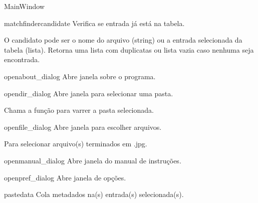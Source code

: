 \documentclass[letterpaper,10pt,portuguese]{manual}
\begin{document}
\begin{classdesc}{MainWindow}{}
\hypertarget{veliger.MainWindow.matchfinder}{}\begin{methoddesc}{matchfinder}{candidate}
Verifica se entrada já está na tabela.

O candidato pode ser o nome do arquivo (string) ou a entrada
selecionada da tabela (lista). Retorna uma lista com duplicatas ou
lista vazia caso nenhuma seja encontrada.
\end{methoddesc}

\hypertarget{veliger.MainWindow.openabout\_dialog}{}\begin{methoddesc}{openabout\_dialog}{}
Abre janela sobre o programa.
\end{methoddesc}

\hypertarget{veliger.MainWindow.opendir\_dialog}{}\begin{methoddesc}{opendir\_dialog}{}
Abre janela para selecionar uma pasta.

Chama a função para varrer a pasta selecionada.
\end{methoddesc}

\hypertarget{veliger.MainWindow.openfile\_dialog}{}\begin{methoddesc}{openfile\_dialog}{}
Abre janela para escolher arquivos.

Para selecionar arquivo(s) terminados em .jpg.
\end{methoddesc}

\hypertarget{veliger.MainWindow.openmanual\_dialog}{}\begin{methoddesc}{openmanual\_dialog}{}
Abre janela do manual de instruções.
\end{methoddesc}

\hypertarget{veliger.MainWindow.openpref\_dialog}{}\begin{methoddesc}{openpref\_dialog}{}
Abre janela de opções.
\end{methoddesc}

\hypertarget{veliger.MainWindow.pastedata}{}\begin{methoddesc}{pastedata}{}
Cola metadados na(s) entrada(s) selecionada(s).
\end{methoddesc}


\end{classdesc}
\end{document}
